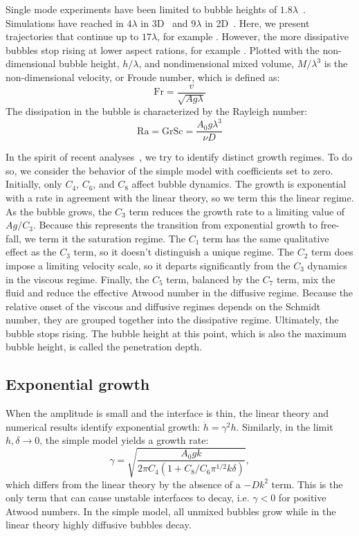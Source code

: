 Single mode experiments have been limited to bubble heights of $1.8\lambda$~\cite{Wilkinson2007}.
Simulations have reached in $4\lambda$ in 3D~\cite{Ramaprabhu2012} and $9\lambda$ in 2D~\cite{Wei2012}.
Here, we present trajectories that continue up to $17\lambda$, for example .
However, the more dissipative bubbles stop rising at lower aspect rations, for example .
Plotted with the non-dimensional bubble height, $h / \lambda$, and nondimensional mixed volume, $M / \lambda^3$ is the non-dimensional velocity, or Froude number, which is defined as:
\begin{equation}
  \text{Fr} = \frac{v}{\sqrt{A g \lambda}}
\end{equation}
The dissipation in the bubble is characterized by the Rayleigh number:
\begin{equation}
  \text{Ra} = \text{Gr} \text{Sc} = \frac{A_0 g \lambda^3}{\nu D}
\end{equation}

In the spirit of recent analyses~\cite{Ramaprabhu2012, Wei2012}, we try to identify distinct growth regimes.
To do so, we consider the behavior of the simple model with coefficients set to zero.
Initially, only $C_4$, $C_6$, and $C_8$ affect bubble dynamics.
The growth is exponential with a rate in agreement with the linear theory, so we term this the linear regime.
As the bubble grows, the $C_3$ term reduces the growth rate to a limiting value of $A g / C_3$.
Because this represents the transition from exponential growth to free-fall, we term it the saturation regime.
The $C_1$ term has the same qualitative effect as the $C_3$ term, so it doesn't distinguish a unique regime.
The $C_2$ term does impose a limiting velocity scale, so it departs significantly from the $C_3$ dynamics in the viscous regime.
Finally, the $C_5$ term, balanced by the $C_7$ term, mix the fluid and reduce the effective Atwood number in the diffusive regime.
Because the relative onset of the viscous and diffusive regimes depends on the Schmidt number, they are grouped together into the dissipative regime.
Ultimately, the bubble stops rising.
The bubble height at this point, which is also the maximum bubble height, is called the penetration depth.

\subsection{Exponential growth}
When the amplitude is small and the interface is thin, the linear theory and numerical results identify exponential growth: $\ddot{h} = \gamma^2 h$.
Similarly, in the limit $h, \delta \rightarrow 0$, the simple model yields a growth rate:
\begin{equation}
\gamma = \sqrt{\frac{A_0 g k}{2 \pi C_4(1 + C_8 / C_6 \pi^{1/2} k \delta)}},
\end{equation}
which differs from the linear theory by the absence of a $-D k^2$ term.
This is the only term that can cause unstable interfaces to decay, i.e. $\gamma < 0$ for positive Atwood numbers.
In the simple model, all unmixed bubbles grow while in the linear theory highly diffusive bubbles decay.

